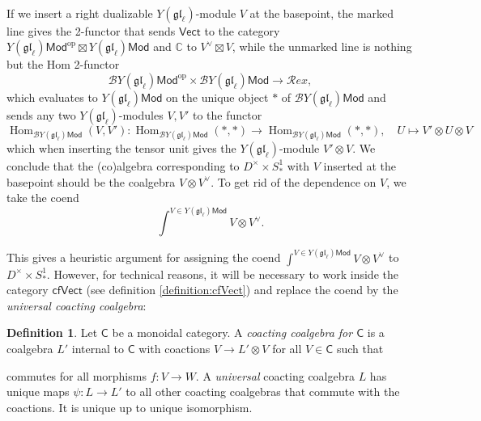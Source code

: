 \documentclass[11pt]{report}
\theoremstyle{definition}
\newtheorem{definition}[theorem]{Definition}
\theoremstyle{remark}
\theoremstyle{remark}
\newcommand{\Hom}{\operatorname{Hom}}
\newcommand{\id}{\textnormal{id}}
\newcommand{\C}{\mathbb{C}}
\begin{document}
~\\
If we insert a right dualizable $Y(\mathfrak{gl}_\ell)$-module $V$ at the basepoint, the marked line gives the 2-functor that sends $\mathsf{Vect}$ to the category $Y(\mathfrak{gl}_\ell)\mathsf{Mod}^\text{op} \boxtimes Y(\mathfrak{gl}_\ell)\mathsf{Mod}$ and $\C$ to $V^\vee \boxtimes V$, while the unmarked line is nothing but the Hom 2-functor
\begin{equation*}
\mathcal{B}Y(\mathfrak{gl}_\ell)\mathsf{Mod}^\text{op} \times \mathcal{B}Y(\mathfrak{gl}_\ell)\mathsf{Mod} \to \mathcal{R}ex,
\end{equation*}
which evaluates to $Y(\mathfrak{gl}_\ell)\mathsf{Mod}$ on the unique object $*$ of $\mathcal{B}Y(\mathfrak{gl}_\ell)\mathsf{Mod}$ and sends any two $Y(\mathfrak{gl}_\ell)$-modules $V,V'$ to the functor
\begin{equation*}
\Hom_{\mathcal{B}Y(\mathfrak{gl}_\ell)\mathsf{Mod}}(V,V'): \Hom_{\mathcal{B}Y(\mathfrak{gl}_\ell)\mathsf{Mod}}(*,*) \to \Hom_{\mathcal{B}Y(\mathfrak{gl}_\ell)\mathsf{Mod}}(*,*), \quad U \mapsto V' \otimes U \otimes V
\end{equation*}
which when inserting the tensor unit gives the $Y(\mathfrak{gl}_\ell)$-module $V' \otimes V$. We conclude that the (co)algebra corresponding to $D^\times \times S_*^1$ with $V$ inserted at the basepoint should be the coalgebra $V \otimes V^\vee$. To get rid of the dependence on $V$, we take the coend
\begin{equation*}
\int^{V \in Y(\mathfrak{gl}_\ell)\mathsf{Mod}} V \otimes V^\vee.
\end{equation*}

This gives a heuristic argument for assigning the coend $\int^{V \in Y(\mathfrak{gl}_\ell)\mathsf{Mod}} V \otimes V^\vee$ to $D^\times \times S_*^1$. However, for technical reasons, it will be necessary to work inside the category $\mathsf{cfVect}$ (see definition \ref{definition:cfVect}) and replace the coend by the \emph{universal coacting coalgebra}:

\begin{definition}
Let $\mathsf{C}$ be a monoidal category. A \emph{coacting coalgebra for $\mathsf{C}$} is a coalgebra $L'$ internal to $\mathsf{C}$ with coactions $V \to L' \otimes V$ for all $V \in \mathsf{C}$ such that
\begin{center}
\end{center}
commutes for all morphisms $f: V \to W$. A \emph{universal} coacting coalgebra $L$ has unique maps $\psi: L \to L'$ to all other coacting coalgebras that commute with the coactions. It is unique up to unique isomorphism.
\end{definition}
\end{document}
